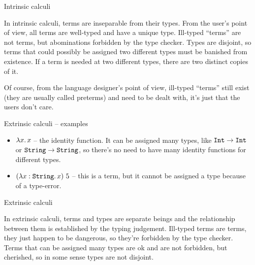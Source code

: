 \documentclass{beamer}
\begin{document}
\begin{frame}{Intrinsic calculi}

In intrinsic calculi, terms are inseparable from their types. From the user's point of view, all terms are well-typed and have a unique type. Ill-typed ``terms'' are not terms, but abominations forbidden by the type checker. Types are disjoint, so terms that could possibly be assigned two different types must be banished from existence. If a term is needed at two different types, there are two distinct copies of it.

\vspace{2em}

Of course, from the language designer's point of view, ill-typed ``terms'' still exist (they are usually called preterms) and need to be dealt with, it's just that the users don't care.

\end{frame}

\begin{frame}{Extrinsic calculi -- examples}

\begin{itemize}
  \item $\fun{x}{x}$ -- the identity function. It can be assigned many types, like $\texttt{Int} \to \texttt{Int}$ or $\texttt{String} \to \texttt{String}$, so there's no need to have many identity functions for different types.
  \item $\app{(\fun{x}[\String]{x})}{5}$ -- this is a term, but it cannot be assigned a type because of a type-error.
\end{itemize}

\end{frame}

\begin{frame}{Extrinsic calculi}

In extrinsic calculi, terms and types are separate beings and the relationship between them is established by the typing judgement. Ill-typed terms are terms, they just happen to be dangerous, so they're forbidden by the type checker. Terms that can be assigned many types are ok and are not forbidden, but cherished, so in some sense types are not disjoint.

\end{frame}
\end{document}
